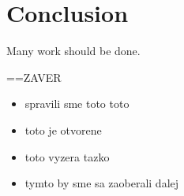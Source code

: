 \section*{Conclusion}

Many work should be done. 


==ZAVER 
\begin{itemize} 
\item   spravili sme toto toto
\item   toto je otvorene
\item   toto vyzera tazko
\item   tymto by sme sa zaoberali dalej 
\end{itemize} 

